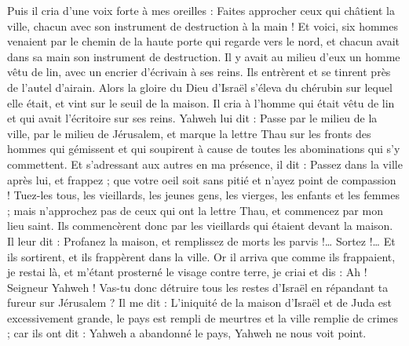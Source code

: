 \begin{multicols}{2}
\VerseOne{}Puis il cria d'une voix forte à mes oreilles : Faites approcher ceux qui châtient la ville, chacun avec son instrument de destruction à la main !
Et voici, six hommes venaient par le chemin de la haute porte qui regarde vers le nord, et chacun avait dans sa main son instrument de destruction. Il y avait au milieu d'eux un homme vêtu de lin, avec un encrier d'écrivain à ses reins. Ils entrèrent et se tinrent près de l'autel d'airain.
Alors la gloire du Dieu d'Israël s'éleva du chérubin sur lequel elle était, et vint sur le seuil de la maison. Il cria à l'homme qui était vêtu de lin et qui avait l'écritoire sur ses reins.
Yahweh lui dit : Passe par le milieu de la ville, par le milieu de Jérusalem, et marque la lettre Thau sur les fronts des hommes qui gémissent et qui soupirent à cause de toutes les abominations qui s'y commettent.
Et s'adressant aux autres en ma présence, il dit : Passez dans la ville après lui, et frappez ; que votre oeil soit sans pitié et n'ayez point de compassion !
Tuez-les tous, les vieillards, les jeunes gens, les vierges, les enfants et les femmes ; mais n'approchez pas de ceux qui ont la lettre Thau, et commencez par mon lieu saint. Ils commencèrent donc par les vieillards qui étaient devant la maison.
Il leur dit : Profanez la maison, et remplissez de morts les parvis !… Sortez !… Et ils sortirent, et ils frappèrent dans la ville.
Or il arriva que comme ils frappaient, je restai là, et m'étant prosterné le visage contre terre, je criai et dis : Ah ! Seigneur Yahweh ! Vas-tu donc détruire tous les restes d'Israël en répandant ta fureur sur Jérusalem ?
Il me dit : L'iniquité de la maison d'Israël et de Juda est excessivement grande, le pays est rempli de meurtres et la ville remplie de crimes ; car ils ont dit : Yahweh a abandonné le pays, Yahweh ne nous voit point.

\end{multicols}
